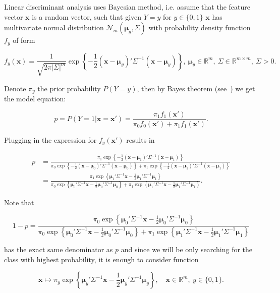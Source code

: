 \documentclass[12pt, a4paper]{report}
\newcommand{\R}{\mathbb{R}}
\theoremstyle{plain}
\theoremstyle{plain}
\theoremstyle{remark}
\begin{document}
Linear discriminant analysis uses Bayesian method, i.e. assume that the feature vector $\pmb{x}$ is a random vector, such that given $Y=y$ for $y\in\{0,1\}$ $\pmb{x}$ has multivariate normal distribution $\mathcal{N}_m(\pmb{\mu}_y, \Sigma)$ with probability density function $f_y$ of form

$$
f_y(\pmb{x}) = \frac{1}{\sqrt{2\pi |\Sigma|^m}} \exp\left\{-\frac{1}{2}\left(\pmb{x} - \pmb{\mu}_y\right)'\Sigma^{-1}\left(\pmb{x}-\pmb{\mu}_y\right)\right\},\ \pmb{\mu}_y\in \R^m, \ \Sigma\in \R^{m\times m},\ \Sigma > 0.
$$

Denote $\pi_y$ the prior probability $P(Y=y)$, then by Bayes theorem (see~\citep{Lehmann}) we get the model equation:

$$
p = P\left(Y=1|\pmb{x}=\pmb{x}'\right) = \frac{\pi_1f_1(\pmb{x}')}{\pi_0f_0(\pmb{x}') + \pi_1f_1(\pmb{x}')}.
$$

Plugging in the expression for $f_y(\pmb{x}')$ results in

\begin{align*}
p &= \frac{\pi_1 \exp\left\{-\frac{1}{2}\left(\pmb{x} - \pmb{\mu}_1\right)'\Sigma^{-1}\left(\pmb{x}-\pmb{\mu}_1\right)\right\}}{\pi_0 \exp\left\{-\frac{1}{2}\left(\pmb{x} - \pmb{\mu}_0\right)'\Sigma^{-1}\left(\pmb{x}-\pmb{\mu}_0\right)\right\} + \pi_1 \exp\left\{-\frac{1}{2}\left(\pmb{x} - \pmb{\mu}_1\right)'\Sigma^{-1}\left(\pmb{x}-\pmb{\mu}_1\right)\right\}}\\
&= \frac{\pi_1\exp\left\{\pmb{\mu}_1'\Sigma^{-1}\pmb{x} - \frac{1}{2}\pmb{\mu}_1'\Sigma^{-1}\pmb{\mu}_1\right\}}{\pi_0\exp\left\{\pmb{\mu}_0'\Sigma^{-1}\pmb{x} - \frac{1}{2}\pmb{\mu}_0'\Sigma^{-1}\pmb{\mu}_0\right\} + \pi_1\exp\left\{\pmb{\mu}_1'\Sigma^{-1}\pmb{x} - \frac{1}{2}\pmb{\mu}_1'\Sigma^{-1}\pmb{\mu}_1\right\}}.
\end{align*}

Note that

$$
1-p = \frac{\pi_0\exp\left\{\pmb{\mu}_0'\Sigma^{-1}\pmb{x} - \frac{1}{2}\pmb{\mu}_0'\Sigma^{-1}\pmb{\mu}_0\right\}}{\pi_0\exp\left\{\pmb{\mu}_0'\Sigma^{-1}\pmb{x} - \frac{1}{2}\pmb{\mu}_0'\Sigma^{-1}\pmb{\mu}_0\right\} + \pi_1\exp\left\{\pmb{\mu}_1'\Sigma^{-1}\pmb{x} - \frac{1}{2}\pmb{\mu}_1'\Sigma^{-1}\pmb{\mu}_1\right\}}
$$

has the exact same denominator as $p$ and since we will be only searching for the class with highest probability, it is enough to consider function

\begin{equation}
\label{eq:mlt_sml_lda_d_exp_delta}
\pmb{x} \mapsto \pi_y\exp\left\{\pmb{\mu}_y'\Sigma^{-1}\pmb{x} - \frac{1}{2}\pmb{\mu}_y'\Sigma^{-1}\pmb{\mu}_y\right\},\quad \pmb{x}\in\R^m,\ y\in\{0,1\}.
\end{equation}
\end{document}
